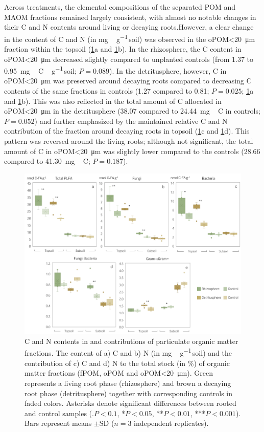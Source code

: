 Across treatments, the elemental compositions of the separated POM and MAOM fractions remained largely consistent, with almost no notable changes in their C and N contents around living or decaying roots.However, a clear change in the content of C and N (in \si{mg\,\gram^{-1}}\,soil) was observed in the oPOM<\SI{20}{\micro\metre} fraction within the topsoil (\ref{fig:M5-F2}a and \ref{fig:M5-F2}b). In the rhizosphere, the C content in oPOM<\SI{20}{\micro\metre} decreased slightly compared to unplanted controls (from \num{1.37} to \SI{0.95}{mg\,C\,\gram^{-1}}\,soil; \(P= 0.089\)). In the detritusphere, however, C in oPOM<\SI{20}{\micro\metre} was preserved around decaying roots compared to decreasing C contents of the same fractions in controls (\num{1.27} compared to \num{0.81}; \(P=0.025\); \ref{fig:M5-F2}a and \ref{fig:M5-F2}b). This was also reflected in the total amount of C allocated in oPOM<\SI{20}{\micro\metre} in the detritusphere (\num{38.07} compared to \SI{24.44}{mg\,C} in controls; \(P=0.052\)) and further emphasized by the maintained relative C and N contribution of the fraction around decaying roots in topsoil (\ref{fig:M5-F2}c and \ref{fig:M5-F2}d). This pattern was reversed around the living roots; although not significant, the total amount of C in oPOM<\SI{20}{\micro\metre} was slightly lower compared to the controls (\num{28.66} compared to \SI{41.30}{mg\,C}; \(P=0.187\)).

\begin{figure}[H]
	\centering
	\includegraphics[width=1\textwidth]{img/M5-Figure_2.png}
	\caption{C and N contents in and contributions of particulate organic matter fractions. The content of a) C and b) N (in \si{mg\,\gram^{-1}}\,soil) and the contribution of c) C and d) N to the total stock (in \%) of organic matter fractions (fPOM, oPOM and oPOM<\SI{20}{\micro\metre}). Green represents a living root phase (rhizosphere) and brown a decaying root phase (detritusphere) together with corresponding controls in faded colors. Asterisks denote significant differences between rooted and control samples (\(.P < 0.1\), *\(P < 0.05\), **\(P < 0.01\), ***\(P < 0.001\)). Bars represent means \(\pm\)SD (\(n=3\) independent replicates).}
	\label{fig:M5-F2}
\end{figure}

